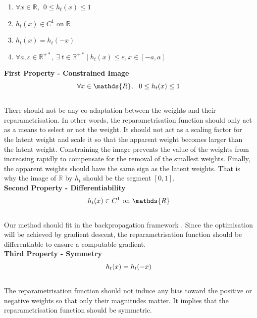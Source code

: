 \begin{enumerate}
  \item $\forall x \in \mathds{R},~~ 0 \leq h_t(x) \leq 1 $
  \item $h_t(x) \in C^1 \text{ on } \mathds{R}$
  \item $h_t(x) = h_t(-x)$
  \item $\forall a,\varepsilon \in\mathds{R}^{+\ast},~ \exists ~t
          \in\mathds{R}^{+\ast} ~ | ~ h_t(x) \leq \varepsilon, x \in [-a,a]$\\
\end{enumerate}

\noindent\textbf{First Property - Constrained Image} \\
\begin{equation}
  \centering
  \forall x \in \mathds{R},~~ 0 \leq h_t(x) \leq 1
  \label{eqn:chap1:reparam_prop1}
\end{equation}
\\
There should not be any co-adaptation between the weights and their
reparametrisation. In other words, the reparametrisation function should only
act as a means to select or not the weight. It should not act as a scaling
factor for the latent weight and scale it so that the apparent weight becomes
larger than the latent weight. Constraining the image prevents the value of the
weights from increasing rapidly to compensate for the removal of the smallest
weights. Finally, the apparent weights should have the same sign as the latent
weights. That is why the image of $\mathds{R}$ by $h_t$ should be the segment
$[0,1]$.\\

\noindent\textbf{Second Property - Differentiability} \\
\begin{equation}
  \centering
  h_t(x) \in C^1 \text{ on } \mathds{R}
  \label{eqn:chap1:reparam_prop2}
\end{equation}
\\
Our method should fit in the backpropagation framework \cite{rumelhart1986learning}. Since the optimisation will
be achieved by gradient descent, the reparametrisation function should be
differentiable to ensure a computable gradient.\\

\noindent\textbf{Third Property - Symmetry} \\

\begin{equation}
  \centering
  h_t(x) = h_t(-x)
  \label{eqn:chap1:reparam_prop3}
\end{equation}
\\
The reparametrisation function should not induce any bias toward the positive or
negative weights so that only their magnitudes matter. It implies that the
reparametrisation function should be symmetric.\\


